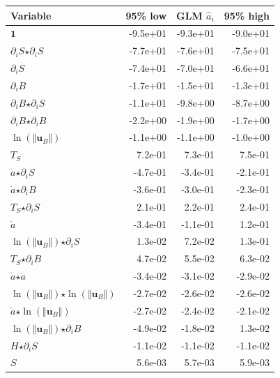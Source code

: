 \newpage

\begin{table}[H]
\centering
\begin{tabular}{l|r|r|r}
  \textbf{Variable} & \textbf{95\% low} & \textbf{GLM} $\hat{a}_i$ & \textbf{95\% high} \\
  \hline
  $\mathbf{1}$ & -9.5e+01 & -9.3e+01 & -9.0e+01 \\
  $\partial_i S$$ \star $$\partial_i S$ & -7.7e+01 & -7.6e+01 & -7.5e+01 \\
  $\partial_i S$ & -7.4e+01 & -7.0e+01 & -6.6e+01 \\
  $\partial_i B$ & -1.7e+01 & -1.5e+01 & -1.3e+01 \\
  $\partial_i B$$ \star $$\partial_i S$ & -1.1e+01 & -9.8e+00 & -8.7e+00 \\
  $\partial_i B$$ \star $$\partial_i B$ & -2.2e+00 & -1.9e+00 & -1.7e+00 \\
  $\ln\left( \Vert \mathbf{u}_B \Vert \right)$ & -1.1e+00 & -1.1e+00 & -1.0e+00 \\
  $T_S$ & 7.2e-01 & 7.3e-01 & 7.5e-01 \\
  $\dot{a}$$ \star $$\partial_i S$ & -4.7e-01 & -3.4e-01 & -2.1e-01 \\
  $\dot{a}$$ \star $$\partial_i B$ & -3.6e-01 & -3.0e-01 & -2.3e-01 \\
  $T_S$$ \star $$\partial_i S$ & 2.1e-01 & 2.2e-01 & 2.4e-01 \\
  \color{red}$\dot{a}$ & \color{red}-3.4e-01 & \color{red}-1.1e-01 & \color{red}1.2e-01 \\
  $\ln\left( \Vert \mathbf{u}_B \Vert \right)$$ \star $$\partial_i S$ & 1.3e-02 & 7.2e-02 & 1.3e-01 \\
  $T_S$$ \star $$\partial_i B$ & 4.7e-02 & 5.5e-02 & 6.3e-02 \\
  $\dot{a}$$ \star $$\dot{a}$ & -3.4e-02 & -3.1e-02 & -2.9e-02 \\
  $\ln\left( \Vert \mathbf{u}_B \Vert \right)$$ \star $$\ln\left( \Vert \mathbf{u}_B \Vert \right)$ & -2.7e-02 & -2.6e-02 & -2.6e-02 \\
  $\dot{a}$$ \star $$\ln\left( \Vert \mathbf{u}_B \Vert \right)$ & -2.7e-02 & -2.4e-02 & -2.1e-02 \\
  \color{red}$\ln\left( \Vert \mathbf{u}_B \Vert \right)$$ \star $$\partial_i B$ & \color{red}-4.9e-02 & \color{red}-1.8e-02 & \color{red}1.3e-02 \\
  $H$$ \star $$\partial_i S$ & -1.1e-02 & -1.1e-02 & -1.1e-02 \\
  $S$ & 5.6e-03 & 5.7e-03 & 5.9e-03 \\

\end{tabular}
\end{table}
